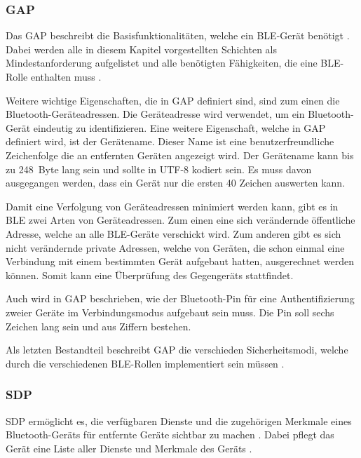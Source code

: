\subsubsection{\acf{GAP}}
Das \acl{GAP} beschreibt die Basisfunktionalitäten, welche ein \ac{BLE}-Gerät benötigt \cite[S.~207]{bluetoothCore}. Dabei werden alle in diesem Kapitel vorgestellten Schichten als Mindestanforderung aufgelistet und alle benötigten Fähigkeiten, die eine \ac{BLE}-Rolle enthalten muss \cite[S.~277f., S.~1241]{bluetoothCore}. 

Weitere wichtige Eigenschaften, die in \ac{GAP} definiert sind, sind zum einen die Bluetooth-Geräteadressen. Die Geräteadresse wird verwendet, um ein Bluetooth-Gerät eindeutig zu identifizieren. Eine weitere Eigenschaft, welche in \ac{GAP} definiert wird, ist der Gerätename. Dieser Name ist eine benutzerfreundliche Zeichenfolge die an entfernten Geräten angezeigt wird. Der Gerätename kann bis zu 248~Byte lang sein und sollte in UTF-8 kodiert sein. Es muss davon ausgegangen werden, dass ein Gerät nur die ersten 40 Zeichen auswerten kann. \cite[S.~1251ff.]{bluetoothCore}

Damit eine Verfolgung von Geräteadressen minimiert werden kann, gibt es in \ac{BLE} zwei Arten von Geräteadressen. Zum einen eine sich verändernde öffentliche Adresse, welche an alle \ac{BLE}-Geräte verschickt wird. Zum anderen gibt es sich nicht verändernde private Adressen, welche von Geräten, die schon einmal eine Verbindung mit einem bestimmten Gerät aufgebaut hatten, ausgerechnet werden können. Somit kann eine Überprüfung des Gegengeräts stattfindet. \cite[S.~19]{siliconBLE}

Auch wird in \ac{GAP} beschrieben, wie der Bluetooth-Pin für eine Authentifizierung zweier Geräte im Verbindungsmodus aufgebaut sein muss. Die Pin soll sechs Zeichen lang sein und aus Ziffern bestehen. \cite[S.~1253]{bluetoothCore}

Als letzten Bestandteil beschreibt \ac{GAP} die verschieden Sicherheitsmodi, welche durch die verschiedenen \ac{BLE}-Rollen implementiert sein müssen \cite[S.~1337]{bluetoothCore}.

\subsubsection{\acf{SDP}}
\ac{SDP} ermöglicht es, die verfügbaren Dienste und die zugehörigen Merkmale eines Bluetooth-Geräts für entfernte Geräte sichtbar zu machen \cite[S.~1173]{bluetoothCore}. Dabei pflegt das Gerät eine Liste aller Dienste und Merkmale des Geräts \cite[S.~1177]{bluetoothCore}.

